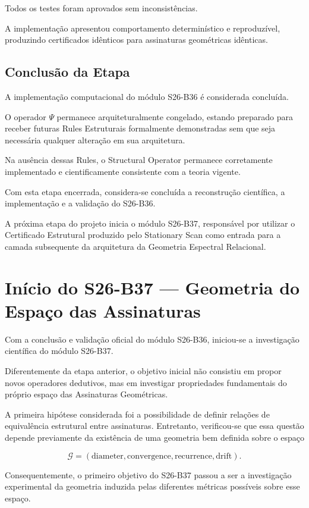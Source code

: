 \documentclass[11pt,a4paper]{article}
\begin{document}
Todos os testes foram aprovados sem inconsistências.

A implementação apresentou comportamento determinístico e reproduzível,
produzindo certificados idênticos para assinaturas geométricas idênticas.

\subsection{Conclusão da Etapa}

A implementação computacional do módulo S26-B36 é considerada concluída.

O operador $\Psi$ permanece arquiteturalmente congelado, estando preparado
para receber futuras Rules Estruturais formalmente demonstradas sem que
seja necessária qualquer alteração em sua arquitetura.

Na ausência dessas Rules, o Structural Operator permanece corretamente
implementado e cientificamente consistente com a teoria vigente.

Com esta etapa encerrada, considera-se concluída a reconstrução científica,
a implementação e a validação do S26-B36.

A próxima etapa do projeto inicia o módulo S26-B37, responsável por utilizar
o Certificado Estrutural produzido pelo Stationary Scan como entrada para a
camada subsequente da arquitetura da Geometria Espectral Relacional.
\section{Início do S26-B37 --- Geometria do Espaço das Assinaturas}

Com a conclusão e validação oficial do módulo S26-B36, iniciou-se a investigação
científica do módulo S26-B37.

Diferentemente da etapa anterior, o objetivo inicial não consistiu em propor
novos operadores dedutivos, mas em investigar propriedades fundamentais do
próprio espaço das Assinaturas Geométricas.

A primeira hipótese considerada foi a possibilidade de definir relações de
equivalência estrutural entre assinaturas. Entretanto, verificou-se que essa
questão depende previamente da existência de uma geometria bem definida sobre o
espaço

\[
\mathcal{G}
=
(\mathrm{diameter},
\mathrm{convergence},
\mathrm{recurrence},
\mathrm{drift}).
\]

Consequentemente, o primeiro objetivo do S26-B37 passou a ser a investigação
experimental da geometria induzida pelas diferentes métricas possíveis sobre
esse espaço.
\end{document}
